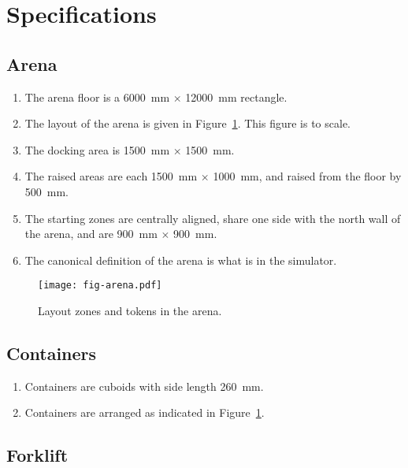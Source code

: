 \section{Specifications}
\label{sec:specs}

\subsection{Arena}
\label{spec:arena}

\begin{enumerate}
  \item The arena floor is a \SI{6000}{mm} $\times$ \SI{12000}{mm} rectangle.
  \item The layout of the arena is given in Figure~\ref{fig:arena}. This
        figure is to scale.
  \item The docking area is \SI{1500}{mm} $\times$ \SI{1500}{mm}.
  \item The raised areas are each \SI{1500}{mm} $\times$ \SI{1000}{mm},
        and raised from the floor by \SI{500}{mm}.
  \item The starting zones are centrally aligned, share one side with the
        north wall of the arena, and are \SI{900}{mm} $\times$ \SI{900}{mm}.
  \item The canonical definition of the arena is what is in the simulator.
\end{enumerate}

\begin{figure}
  \centering
  \texttt{[image: fig-arena.pdf]}
  \caption{Layout zones and tokens in the arena.}
  \label{fig:arena}
\end{figure}

\subsection{Containers}
\label{spec:containers}

\begin{enumerate}
  \item Containers are cuboids with side length \SI{260}{mm}.
  \item Containers are arranged as indicated in Figure~\ref{fig:arena}.
\end{enumerate}

\subsection{Forklift}
\label{spec:forklift}

